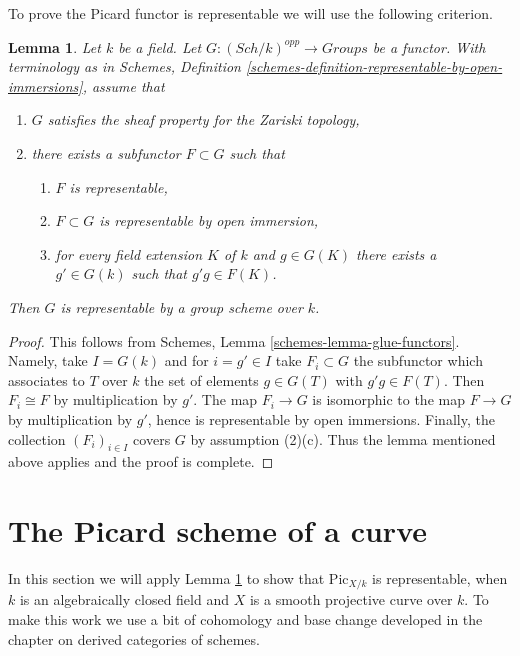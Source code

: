 \documentclass{stacks-project}
\theoremstyle{plain}
\newtheorem{lemma}[subsection]{Lemma}
\theoremstyle{definition}
\theoremstyle{remark}
\numberwithin{equation}{subsection}
\def\Sch{\mathit{Sch}}
\def\Picardfunctor{\mathrm{Pic}}
\begin{document}
\noindent
To prove the Picard functor is representable we will use the following
criterion.

\begin{lemma}
\label{lemma-criterion}
Let $k$ be a field. Let $G : (\Sch/k)^{opp} \to \textit{Groups}$ be a
functor. With terminology as in
Schemes, Definition \ref{schemes-definition-representable-by-open-immersions},
assume that
\begin{enumerate}
\item $G$ satisfies the sheaf property for the Zariski topology,
\item there exists a subfunctor $F \subset G$ such that
\begin{enumerate}
\item $F$ is representable,
\item $F \subset G$ is representable by open immersion,
\item for every field extension $K$ of $k$ and $g \in G(K)$
there exists a $g' \in G(k)$ such that $g'g \in F(K)$.
\end{enumerate}
\end{enumerate}
Then $G$ is representable by a group scheme over $k$.
\end{lemma}

\begin{proof}
This follows from Schemes, Lemma \ref{schemes-lemma-glue-functors}.
Namely, take $I = G(k)$ and for $i = g' \in I$ take $F_i \subset G$
the subfunctor which associates to $T$ over $k$ the set of elements
$g \in G(T)$ with $g'g \in F(T)$. Then $F_i \cong F$ by multiplication
by $g'$. The map $F_i \to G$ is isomorphic to the map $F \to G$
by multiplication by $g'$, hence is representable by open immersions.
Finally, the collection $(F_i)_{i \in I}$ covers $G$ by assumption (2)(c).
Thus the lemma mentioned above applies and the proof is complete.
\end{proof}



\section{The Picard scheme of a curve}
\label{section-picard-curve}

\noindent
In this section we will apply Lemma \ref{lemma-criterion} to show that
$\Picardfunctor_{X/k}$ is representable, when $k$ is an algebraically
closed field and $X$ is a smooth projective curve over $k$. To make this
work we use a bit of cohomology and base change developed in
the chapter on derived categories of schemes.
\end{document}
